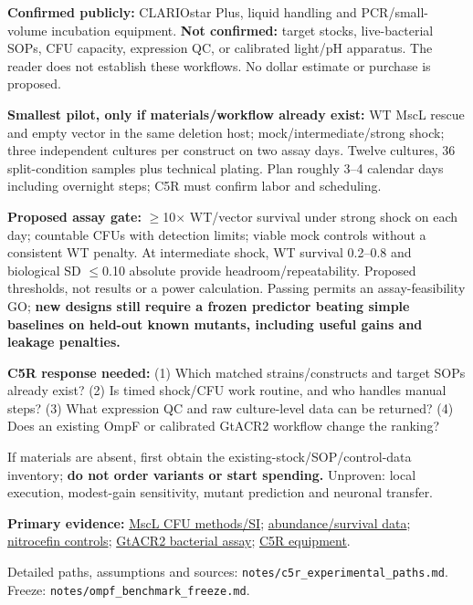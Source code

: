 \documentclass[10pt]{article}
\begin{document}
\textbf{Confirmed publicly:} CLARIOstar Plus, liquid handling and PCR/small-volume incubation equipment.
\textbf{Not confirmed:} target stocks, live-bacterial SOPs, CFU capacity, expression QC, or calibrated light/pH apparatus. The reader does not establish these workflows. No dollar estimate or purchase is proposed.

\textbf{Smallest pilot, only if materials/workflow already exist:} WT MscL rescue and empty vector in the same deletion host; mock/intermediate/strong shock; three independent cultures per construct on two assay days. Twelve cultures, 36 split-condition samples plus technical plating. Plan roughly 3--4 calendar days including overnight steps; C5R must confirm labor and scheduling.

\textbf{Proposed assay gate:} $\geq$10$\times$ WT/vector survival under strong shock on each day; countable CFUs with detection limits; viable mock controls without a consistent WT penalty. At intermediate shock, WT survival 0.2--0.8 and biological SD $\leq$0.10 absolute provide headroom/repeatability. Proposed thresholds, not results or a power calculation. Passing permits an assay-feasibility GO; \textbf{new designs still require a frozen predictor beating simple baselines on held-out known mutants, including useful gains and leakage penalties.}

\textbf{C5R response needed:} (1) Which matched strains/constructs and target SOPs already exist? (2) Is timed shock/CFU work routine, and who handles manual steps? (3) What expression QC and raw culture-level data can be returned? (4) Does an existing OmpF or calibrated GtACR2 workflow change the ranking?

If materials are absent, first obtain the existing-stock/SOP/control-data inventory; \textbf{do not order variants or start spending.}
Unproven: local execution, modest-gain sensitivity, mutant prediction and neuronal transfer.

\scriptsize
\textbf{Primary evidence:}
\href{https://journals.plos.org/plosone/article?id=10.1371/journal.pone.0137994}{MscL CFU methods/SI};
\href{https://www.rpgroup.caltech.edu/mscl_survival/main.html}{abundance/survival data};
\href{https://cmdr.ubc.ca/bobh/method/nitrocefin-assay-on-whole-cells-for-outer-membrane-permeability-assessment/}{nitrocefin controls};
\href{https://pmc.ncbi.nlm.nih.gov/articles/PMC6194965/}{GtACR2 bacterial assay};
\href{https://c5r.net/sciuniverse/suites/pcr-recovery/}{C5R equipment}.\par
Detailed paths, assumptions and sources: \texttt{notes/c5r\_experimental\_paths.md}.
Freeze: \texttt{notes/ompf\_benchmark\_freeze.md}.
\end{document}
